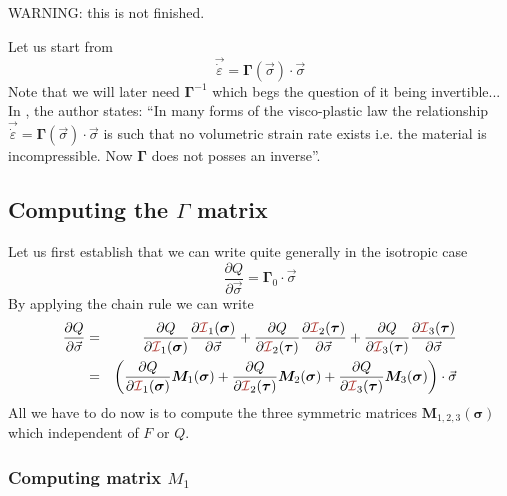 

WARNING: this is not finished. 

Let us start from 
\[
\vec{\dot{\varepsilon}} = {\bm \Gamma}(\vec\sigma)\cdot \vec\sigma
\]
Note that we will later need $\bm\Gamma^{-1}$ which begs the question 
of it being invertible... 
In \textcite{zien75}, the author states: ``In many forms of the 
visco-plastic law the relationship $\vec{\dot{\varepsilon}} = {\bm \Gamma}(\vec\sigma)\cdot \vec\sigma$ is such that no volumetric strain rate 
exists i.e. the material is incompressible. 
Now ${\bm \Gamma}$ does not posses an inverse''.


\subsection{Computing the ${\Gamma}$ matrix}


Let us first establish that we can write quite generally in the isotropic case
\[
\frac{\partial Q}{\partial \vec\sigma} = {\bm \Gamma}_0 \cdot \vec{\sigma}
\]
By applying the chain rule we can write
\begin{eqnarray}
\frac{\partial Q}{\partial \vec\sigma} 
&=&
\frac{\partial Q}{\partial {\III}_1(\bm\sigma)} 
\frac{\partial {\III}_1(\bm\sigma)}{\partial \vec\sigma} 
+
\frac{\partial Q}{\partial {\III}_2(\bm\tau)} 
\frac{\partial {\III}_2(\bm\tau)}{\partial \vec\sigma}
+
\frac{\partial Q}{\partial {\III}_3(\bm\tau)} 
\frac{\partial {\III}_3(\bm\tau)}{\partial \vec\sigma} \nonumber\\
&=&\left(
\frac{\partial Q}{\partial {\III}_1(\bm\sigma)} {\bm M}_1(\bm\sigma)
+
\frac{\partial Q}{\partial {\III}_2(\bm\tau)}  {\bm M}_2(\bm\sigma)
+
\frac{\partial Q}{\partial {\III}_3(\bm\tau)}  {\bm M}_3(\bm\sigma)
\right) \cdot \vec\sigma
\end{eqnarray}
All we have to do now is to compute the three symmetric matrices ${\bm M}_{1,2,3}(\bm\sigma)$ which independent of $F$ or $Q$.

\subsubsection{Computing matrix $M_1$}


